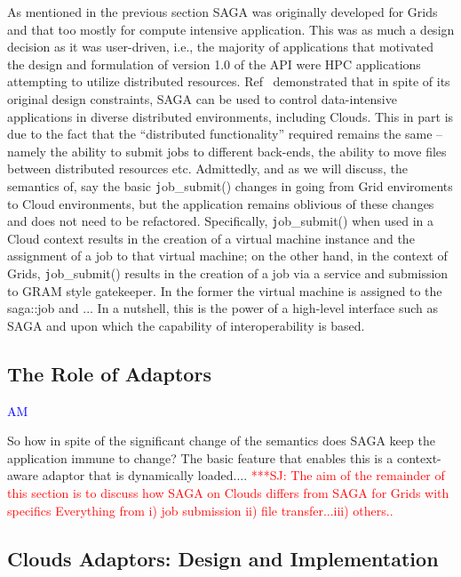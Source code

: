 \documentclass[conference,final]{IEEEtran}
\newcommand{\jhanote}[1]{ {\textcolor{red} { ***SJ: #1 }}}
\newcommand{\jhanote}[1]{}
\begin{document}
As mentioned in the previous section SAGA was originally developed for
Grids and that too mostly for compute intensive application. This was
as much a design decision as it was user-driven, i.e., the majority of
applications that motivated the design and formulation of version 1.0
of the API were HPC applications attempting to utilize distributed
resources.  Ref~\cite{saga_ccgrid09} demonstrated that in spite of its
original design constraints, SAGA can be used to control
data-intensive applications in diverse distributed environments,
including Clouds.  This in part is due to the fact that the
``distributed functionality'' required remains the same -- namely the
ability to submit jobs to different back-ends, the ability to move
files between distributed resources etc. Admittedly, and as we will
discuss, the semantics of, say the basic {\texttt job\_submit()}
changes in going from Grid enviroments to Cloud environments, but the
application remains oblivious of these changes and does not need to be
refactored. Specifically, {\texttt job\_submit()} when used in a Cloud
context results in the creation of a virtual machine instance and the
assignment of a job to that virtual machine; on the other hand, in the
context of Grids, {\texttt job\_submit()} results in the creation of a
job via a service and submission to GRAM style gatekeeper. In the
former the virtual machine is assigned to the saga::job and ...  In a
nutshell, this is the power of a high-level interface such as SAGA and
upon which the capability of interoperability is based.

\subsection{The Role of Adaptors} {\textcolor{blue} {AM}}

So how in spite of the significant change of the semantics does SAGA
keep the application immune to change? The basic feature that enables
this is a context-aware adaptor that is dynamically loaded....
\jhanote{The aim of the remainder of this section is to discuss how
  SAGA on Clouds differs from SAGA for Grids with specifics Everything
  from i) job submission ii) file transfer...iii) others..}


\subsection{Clouds Adaptors: Design and Implementation}

\end{document}
